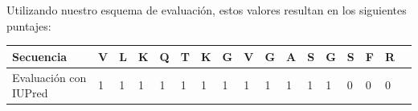 Utilizando nuestro esquema de evaluación, estos valores resultan en los siguientes puntajes:

\vspace{0.5cm}
\begin{adjustbox}{width=\textwidth}
\begin{tabular}{lllllllllllllllll} 
\hline
Secuencia & \textbf{V} & \textbf{L} & \textbf{K} & \textbf{Q} & \textbf{T} & \textbf{K} & \textbf{G} & \textbf{V} & \textbf{G} & \textbf{A} & \textbf{S} & \textbf{G} & \textbf{S} & \textbf{F} & \textbf{R} \\ \hline
Evaluación con IUPred & 1 & 1 & 1 & 1 & 1 & 1 & 1 & 1 & 1 & 1 & 1 & 1 & 0 & 0 & 0\\ \hline
\end{tabular}
\end{adjustbox}







